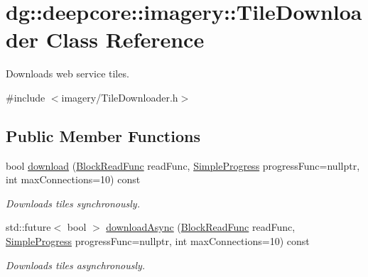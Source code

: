 \hypertarget{structdg_1_1deepcore_1_1imagery_1_1_tile_downloader}{}\section{dg\+:\+:deepcore\+:\+:imagery\+:\+:Tile\+Downloader Class Reference}
\label{structdg_1_1deepcore_1_1imagery_1_1_tile_downloader}


Downloads web service tiles.  




{\ttfamily \#include $<$imagery/\+Tile\+Downloader.\+h$>$}

\subsection*{Public Member Functions}
\begin{DoxyCompactItemize}
\item 
bool \hyperlink{group___imagery_module_gaa827cfb6a45622a0de54b136f7d7b22f}{download} (\hyperlink{group___imagery_module_ga2238c2ef34502f68956ddef1f477ad95}{Block\+Read\+Func} read\+Func, \hyperlink{group___utility_module_ga6763018df79e4bdbcd8cd14cea5342b2}{Simple\+Progress} progress\+Func=nullptr, int max\+Connections=10) const 
\begin{DoxyCompactList}\small\item\em Downloads tiles synchronously. \end{DoxyCompactList}\item 
std\+::future$<$ bool $>$ \hyperlink{group___imagery_module_ga8786d795cb77a5853a8f11310a19aa16}{download\+Async} (\hyperlink{group___imagery_module_ga2238c2ef34502f68956ddef1f477ad95}{Block\+Read\+Func} read\+Func, \hyperlink{group___utility_module_ga6763018df79e4bdbcd8cd14cea5342b2}{Simple\+Progress} progress\+Func=nullptr, int max\+Connections=10) const 
\begin{DoxyCompactList}\small\item\em Downloads tiles asynchronously. \end{DoxyCompactList}\end{DoxyCompactItemize}
